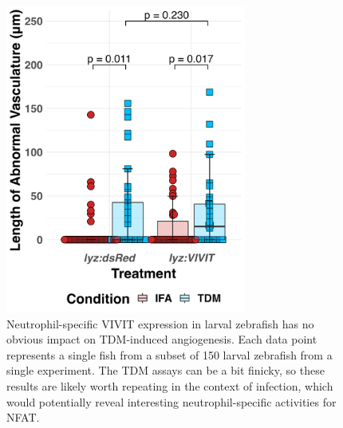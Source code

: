 \begin{figure}
\centering
\includegraphics[height=4in]{images/JB210_lyzVIVIT_TDM_110522.png}
\caption[\textit{lyz}:\textit{VIVIT\hyp{}tdTomato} does not impact angiogenesis]{Neutrophil\hyp{}specific VIVIT expression in larval zebrafish has no obvious impact on TDM\hyp{}induced angiogenesis. Each data point represents a single fish from a subset of 150 larval zebrafish from a single experiment. The TDM assays can be a bit finicky, so these results are likely worth repeating in the context of infection, which would potentially reveal interesting neutrophil\hyp{}specific activities for NFAT.}
\label{figure:lyzvivit}
\end{figure}

